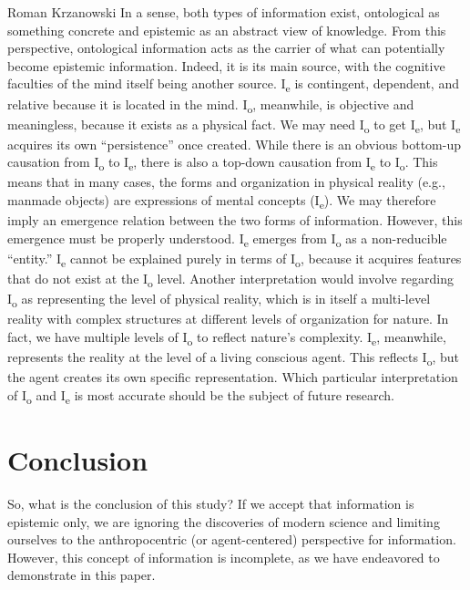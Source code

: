 \begin{artengenv}{Roman Krzanowski}
In a sense, both types of information exist, ontological as something concrete and epistemic as an abstract view of knowledge. From this perspective, ontological information acts as the carrier of what can potentially become epistemic information. Indeed, it is its main source, with the cognitive faculties of the mind itself being another source. I\textsubscript{e} is contingent, dependent, and relative because it is located in the mind. I\textsubscript{o}, meanwhile, is objective and meaningless, because it exists as a physical fact. We may need I\textsubscript{o} to get I\textsubscript{e}, but I\textsubscript{e} acquires its own ``persistence'' once created. While there is an obvious bottom-up causation from I\textsubscript{o} to I\textsubscript{e}, there is also a top-down causation from I\textsubscript{e }to I\textsubscript{o}. This means that in many cases, the forms and organization in physical reality (e.g., manmade objects) are expressions of mental concepts (I\textsubscript{e}). We may therefore imply an emergence relation between the two forms of information. However, this emergence must be properly understood. I\textsubscript{e} emerges from I\textsubscript{o} as a non-reducible ``entity.'' I\textsubscript{e} cannot be explained purely in terms of I\textsubscript{o}, because it acquires features that do not exist at the I\textsubscript{o} level. Another interpretation would involve regarding I\textsubscript{o }as representing the level of physical reality, which is in itself a multi-level reality with complex structures at different levels of organization for nature. In fact, we have multiple levels of I\textsubscript{o} to reflect nature's complexity. I\textsubscript{e}, meanwhile, represents the reality at the level of a living conscious agent. This reflects I\textsubscript{o}, but the agent creates its own specific representation. Which particular interpretation of I\textsubscript{o} and I\textsubscript{e} is most accurate should be the subject of future research.

\section{Conclusion}
So, what is the conclusion of this study? If we accept that information is epistemic only, we are ignoring the discoveries of modern science and limiting ourselves to the anthropocentric (or agent-centered) perspective for information. However, this concept of information is incomplete, as we have endeavored to demonstrate in this paper.


\end{artengenv}
